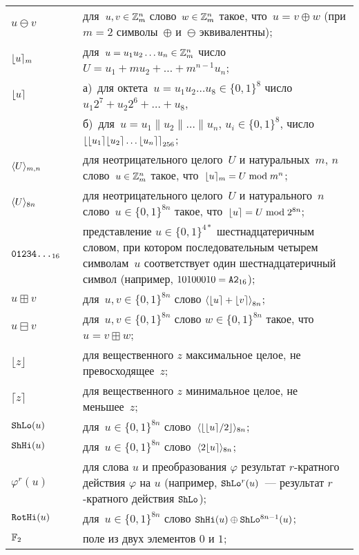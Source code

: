 {\begin{longtable}{lrp{13.2cm}}
\\[4pt]
%
$u\ominus v$ &&
для~$u,v\in\mathbb{Z}_m^n$ 
слово~$w\in\mathbb{Z}_m^n$ такое, что~$u=v\oplus w$
(при $m=2$ символы~$\oplus$ и~$\ominus$ эквивалентны);
\\[4pt]
%
$\lfloor u\rceil_m$ && 
для~$u=u_1 u_2 \ldots u_n\in\mathbb{Z}_m^n$
число~$U=u_1 + m u_2 + \ldots + m^{n-1} u_n$;
\\[4pt]
%
$\lfloor u\rceil$ && 
а)~для октета~$u=u_1 u_2\ldots u_8\in\{0,1\}^8$
число~$u_1 2^7+u_2 2^6 + \ldots + u_8$,\\[2pt]
%
&&
б)~для~$u=u_1\parallel u_2\parallel\ldots\parallel u_n$, $u_i\in\{0,1\}^8$,
число~$\left\lfloor\lfloor u_1\rceil\lfloor u_2\rceil\ldots\lfloor u_n\rceil\right\rceil_{256}$;
\\[4pt]
%
$\langle U\rangle_{m,n}$ && 
для неотрицательного целого~$U$
и натуральных~$m$, $n$ слово~$u\in\mathbb{Z}_m^n$ такое, 
что~$\lfloor u\rceil_m=U\bmod m^n$; 
\\[4pt]
%
$\langle U\rangle_{8n}$ && 
для неотрицательного целого~$U$ и натурального~$n$ 
слово~$u\in\{0,1\}^{8n}$ такое, что~$\lfloor u\rceil=U\bmod 2^{8n}$; 
\\[4pt]
%
$\texttt{01234\ldots}_{16}$ && 
представление $u\in\{0,1\}^{4*}$ шестнадцатеричным словом,
при котором последовательным четырем символам~$u$ соответствует
один шестнадцатеричный символ
(например, $10100010=\texttt{A2}_{16}$);
\\[4pt]
%
$u\boxplus v$  &&
для~$u,v\in\{0,1\}^{8n}$ слово 
$\left\langle\lfloor u\rceil+\lfloor v\rceil\right\rangle_{8n}$;
\\[4pt]
%
$u\boxminus v$ &&
для~$u,v\in\{0,1\}^{8n}$ 
слово $w\in\{0,1\}^{8n}$ такое, что $u=v\boxplus w$;
\\[4pt]
%
$\lfloor z\rfloor$ &&
для вещественного $z$ максимальное целое, не превосходящее~$z$;
\\[4pt]
%
$\lceil z\rceil$ &&
для вещественного $z$ минимальное целое, не меньшее~$z$;
\\[4pt]
%
$\mathop{\texttt{ShLo}}\nolimits(u)$ &&
для~$u\in\{0,1\}^{8n}$ 
слово~$\langle\left\lfloor\lfloor u\rceil/2\right\rfloor\rangle_{8n}$;
\\[4pt]
%
$\mathop{\texttt{ShHi}}\nolimits(u)$ &&
для~$u\in\{0,1\}^{8n}$ 
слово~$\langle2\lfloor u\rceil\rangle_{8n}$;
\\[4pt]
%
$\varphi^r(u)$ &&
для слова $u$ и преобразования $\varphi$
результат $r$-кратного действия $\varphi$ на $u$
(например, $\mathop{\texttt{ShLo}}\nolimits^r(u)$~--- результат $r$-кратного действия $\mathop{\texttt{ShLo}}\nolimits$);
\\[4pt]
%
$\mathop{\texttt{RotHi}}\nolimits(u)$ &&
для~$u\in\{0,1\}^{8n}$ 
слово $\mathop{\texttt{ShHi}}\nolimits(u)\oplus\mathop{\texttt{ShLo}}\nolimits^{8n-1}(u)$;
\\[4pt]
%
$\mathbb{F}_2$ &&
поле из двух элементов $0$ и $1$;
\\[4pt]

\end{longtable}}
